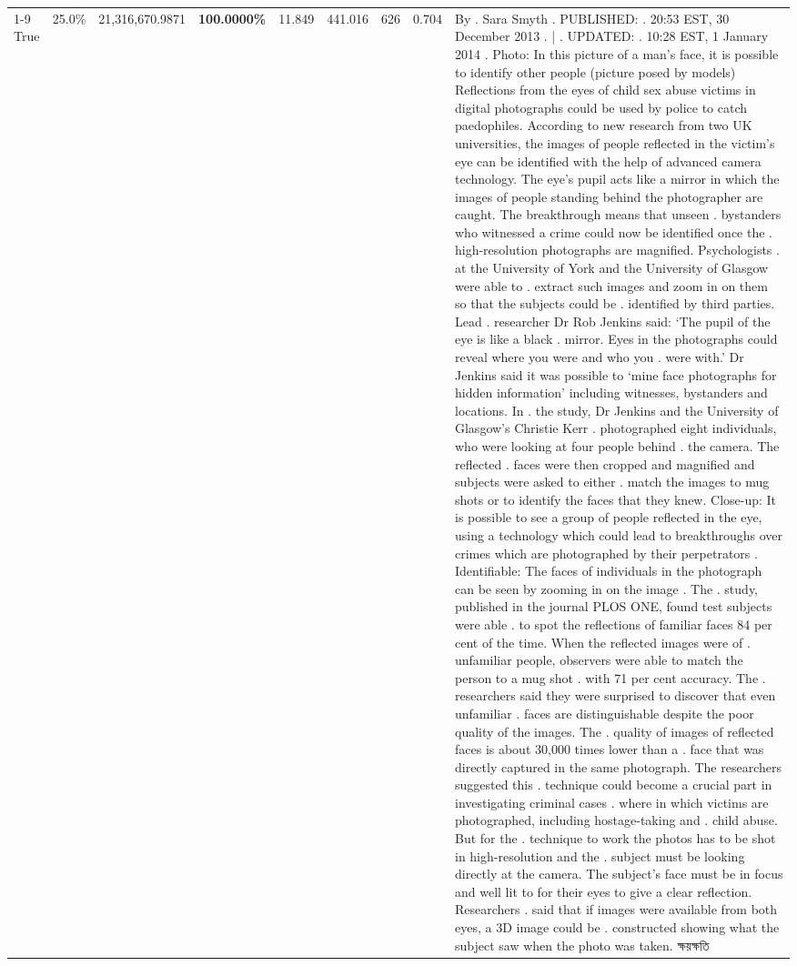\begin{table}[H]
\begin{tabular}{lllrlllll}
\cline{1-9}
True & 25.0\% & 21,316,670.9871 & \bfseries \color{red} 100.0000\% & 11.849 & 441.016 & 626 & 0.704 & By . Sara Smyth . PUBLISHED: . 20:53 EST, 30 December 2013 . | . UPDATED: . 10:28 EST, 1 January 2014 . Photo: In this picture of a man's face, it is possible to identify other people (picture posed by models) Reflections from the eyes of child sex abuse victims in digital photographs could be used by police to catch paedophiles. According to new research from two UK universities, the images of people reflected in the victim's eye can be identified with the help of advanced camera technology. The eye's pupil acts like a mirror in which the images of people standing behind the photographer are caught. The breakthrough means that unseen . bystanders who witnessed a crime could now be identified once the . high-resolution photographs are magnified. Psychologists . at the University of York and the University of Glasgow were able to . extract such images and zoom in on them so that the subjects could be . identified by third parties. Lead . researcher Dr Rob Jenkins said: ‘The pupil of the eye is like a black . mirror. Eyes in the photographs could reveal where you were and who you . were with.' Dr Jenkins said it was possible to ‘mine face photographs for hidden information' including witnesses, bystanders and locations. In . the study, Dr Jenkins and the University of Glasgow's Christie Kerr . photographed eight individuals, who were looking at four people behind . the camera. The reflected . faces were then cropped and magnified and subjects were asked to either . match the images to mug shots or to identify the faces that they knew. Close-up: It is possible to see a group of people reflected in the eye, using a technology which could lead to breakthroughs over crimes which are photographed by their perpetrators . Identifiable: The faces of individuals in the photograph can be seen by zooming in on the image . The . study, published in the journal PLOS ONE, found test subjects were able . to spot the reflections of familiar faces 84 per cent of the time. When the reflected images were of . unfamiliar people, observers were able to match the person to a mug shot . with 71 per cent accuracy. The . researchers said they were surprised to discover that even unfamiliar . faces are distinguishable despite the poor quality of the images. The . quality of images of reflected faces is about 30,000 times lower than a . face that was directly captured in the same photograph. The researchers suggested this . technique could become a crucial part in investigating criminal cases . where in which victims are photographed, including hostage-taking and . child abuse. But for the . technique to work the photos has to be shot in high-resolution and the . subject must be looking directly at the camera. The subject's face must be in focus and well lit to for their eyes to give a clear reflection. Researchers . said that if images were available from both eyes, a 3D image could be . constructed showing what the subject saw when the photo was taken. ক্ষয়ক্ষতি \\

\end{tabular}
\end{table}
